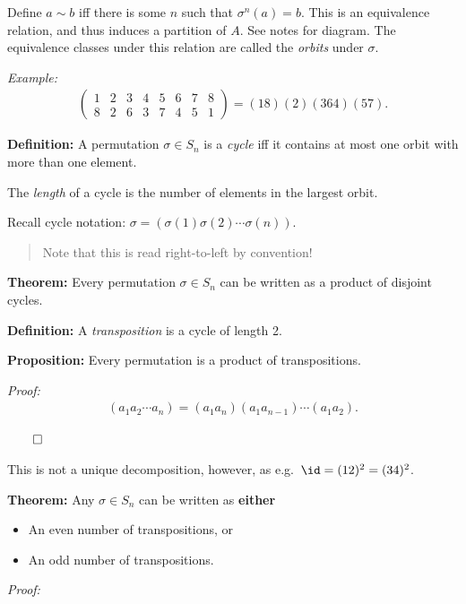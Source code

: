 Define \(a \sim b\) iff there is some \(n\) such that
\(\sigma^{n}(a) = b\). This is an equivalence relation, and thus induces
a partition of \(A\). See notes for diagram. The equivalence classes
under this relation are called the \emph{orbits} under \(\sigma\).

\emph{Example:}
\begin{align*}
\left(\begin{matrix}
1 & 2 & 3 & 4 & 5 & 6 & 7 & 8 \\
8 & 2 & 6 & 3 & 7 & 4 & 5 & 1
\end{matrix}\right) = (1 8)(2)(3 6 4)(5 7).
\end{align*}

\textbf{Definition:} A permutation \(\sigma \in S_{n}\) is a
\emph{cycle} iff it contains at most one orbit with more than one
element.

The \emph{length} of a cycle is the number of elements in the largest
orbit.

Recall cycle notation:
\(\sigma = (\sigma(1) \sigma(2) \cdots \sigma(n))\).

\begin{quote}
Note that this is read right-to-left by convention!
\end{quote}

\textbf{Theorem:} Every permutation \(\sigma \in S_{n}\) can be written
as a product of disjoint cycles.

\textbf{Definition:} A \emph{transposition} is a cycle of length 2.

\textbf{Proposition:} Every permutation is a product of transpositions.

\emph{Proof:}
\begin{align*}
(a_{1} a_{2} \cdots a_{n}) = (a_{1} a_{n}) (a_{1} a_{n-1}) \cdots (a_{1} a_{2})
.\end{align*}

\(\qed\)

This is not a unique decomposition, however, as
e.g.~\(\id = (1 2)^{2} = (3 4)^{2}\).

\textbf{Theorem:} Any \(\sigma \in S_{n}\) can be written as
\textbf{either}

\begin{itemize}
\item
  An even number of transpositions, or
\item
  An odd number of transpositions.
\end{itemize}

\emph{Proof:}

